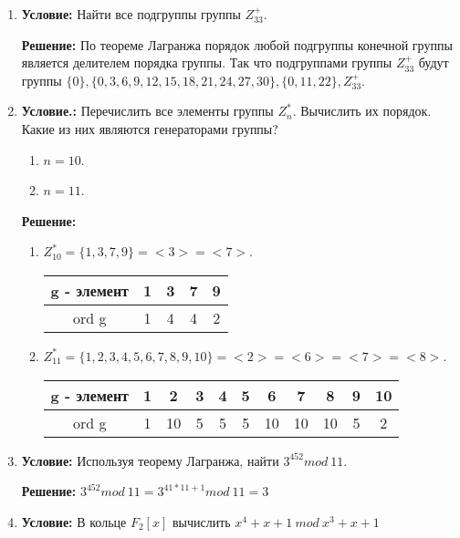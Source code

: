 \documentclass[12pt,a4paper,oneside]{extarticle}
\begin{document}
\begin{enumerate}
    \item {\bf Условие:} Найти все подгруппы группы $Z_{33}^+$.

        {\bf Решение:} По теореме Лагранжа порядок любой подгруппы конечной группы является делителем порядка группы. Так что подгруппами группы $Z_{33}^+$ будут группы $\{0\}, \{0, 3, 6, 9, 12, 15, 18, 21, 24, 27, 30\}, \{0,11,22\}, Z_{33}^+$.

    \item {\bf Условие.:} Перечислить все элементы группы $Z_n^*$. Вычислить их порядок. Какие из них являются генераторами группы?
    \begin{enumerate}
        \item $n=10$.
        \item $n=11$.
    \end{enumerate}

        {\bf Решение:} 
        \begin{enumerate}
            \item $Z_{10}^* = \{1,3,7,9\}=<3>=<7>$.

            \begin{tabular}{ c|c c c c }
                g - элемент & 1 & 3 & 7 & 9 \\
                \hline
                ord g       & 1 & 4 & 4 & 2 \\  
            \end{tabular}

            \item $Z_{11}^* = \{1,2,3,4,5,6,7,8,9,10\}=<2>=<6>=<7>=<8>$.

            \begin{tabular}{ c|c c c c c c c c c c}
                g - элемент & 1 & 2  & 3 & 4 & 5 & 6  & 7  & 8  & 9 & 10\\
                \hline
                ord g       & 1 & 10 & 5 & 5 & 5 & 10 & 10 & 10 & 5 & 2\\  
            \end{tabular}
        \end{enumerate}
    \item {\bf Условие:} Используя теорему Лагранжа, найти $3^{452} mod~11$.

        {\bf Решение:} $3^{452} mod~11 = 3^{41*11+1} mod~11 = 3$


    \item {\bf Условие:} В кольце $F_2[x]$ вычислить $x^4 + x + 1 ~mod~ x^3 + x + 1$


\end{enumerate}
\end{document}
